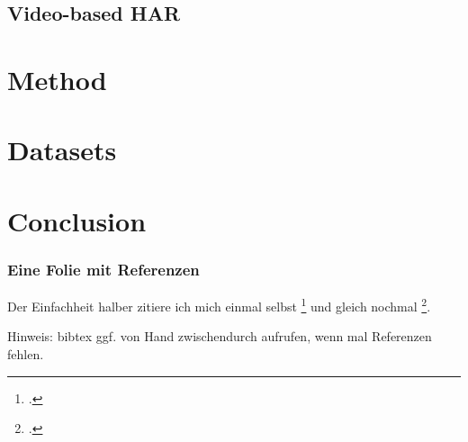 \documentclass[9pt]{beamer}
\providecommand{\fcite}[1]{\footcite{#1}}
\newenvironment{myframe}[1][]{%
\begin{frame}%
\frametitle{#1}
\setcounter{footnote}{0}


}{%
\end{frame}%
}
\begin{document}
\subsection{Video-based HAR}

\section{Method}

\section{Datasets}

\section{Conclusion}

\begin{myframe}[Eine Folie mit Referenzen]
Der Einfachheit halber zitiere ich mich einmal selbst \fcite{wang_approach_2013}
und gleich nochmal \fcite{yang_articulated_2011}.
\vspace*{3ex}

Hinweis: bibtex ggf. von Hand zwischendurch aufrufen, wenn mal Referenzen fehlen.
 
\end{myframe}

\end{document}
